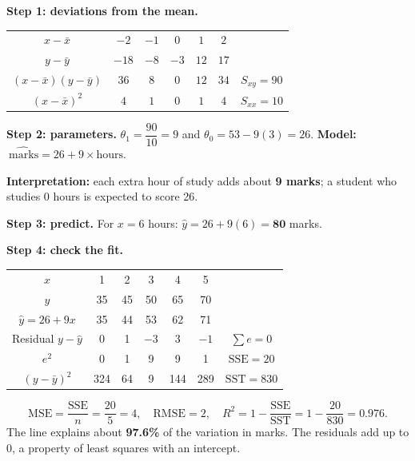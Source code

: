 \begin{example}
\textbf{Step 1: deviations from the mean.}
\begin{center}
\begin{tabular}{@{}c|ccccc|c@{}}
\toprule
$x-\bar x$ & $-2$ & $-1$ & $0$ & $1$ & $2$ & \\
$y-\bar y$ & $-18$ & $-8$ & $-3$ & $12$ & $17$ & \\
$(x-\bar x)(y-\bar y)$ & $36$ & $8$ & $0$ & $12$ & $34$ & $S_{xy}=90$\\
$(x-\bar x)^2$ & $4$ & $1$ & $0$ & $1$ & $4$ & $S_{xx}=10$\\
\bottomrule
\end{tabular}
\end{center}
\textbf{Step 2: parameters.} $\theta_1=\dfrac{90}{10}=9$ and $\theta_0=53-9(3)=26$. \textbf{Model:} $\ \widehat{\text{marks}}=26+9\times\text{hours}$.\par
\textbf{Interpretation:} each extra hour of study adds about \textbf{9 marks}; a student who studies 0 hours is expected to score 26.\par
\textbf{Step 3: predict.} For $x=6$ hours: $\hat y=26+9(6)=\mathbf{80}$ marks.\par
\textbf{Step 4: check the fit.}
\begin{center}
\begin{tabular}{@{}c|ccccc|c@{}}
\toprule
$x$ & 1 & 2 & 3 & 4 & 5 & \\
$y$ & 35 & 45 & 50 & 65 & 70 & \\
$\hat y=26+9x$ & 35 & 44 & 53 & 62 & 71 & \\
Residual $y-\hat y$ & 0 & 1 & $-3$ & 3 & $-1$ & $\sum e=0$\\
$e^2$ & 0 & 1 & 9 & 9 & 1 & $\text{SSE}=20$\\
$(y-\bar y)^2$ & 324 & 64 & 9 & 144 & 289 & $\text{SST}=830$\\
\bottomrule
\end{tabular}
\end{center}
\[
  \text{MSE}=\frac{\text{SSE}}{n}=\frac{20}{5}=4,\quad
  \text{RMSE}=2,\quad
  R^2=1-\frac{\text{SSE}}{\text{SST}}=1-\frac{20}{830}=\mathbf{0.976}.
\]
The line explains about \textbf{97.6\%} of the variation in marks. The residuals add up to $0$, a property of least squares with an intercept.
\end{example}

